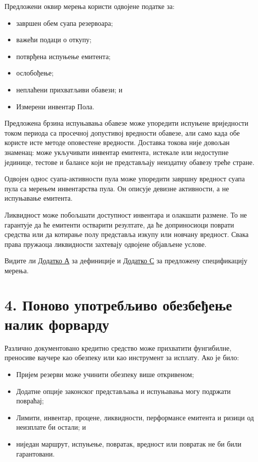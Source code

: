 \documentclass[11pt]{article}
\begin{document}
Предложени оквир мерења користи одвојене податке за:

\begin{itemize}[leftmargin=*]
\item завршен обем суапа резервоара;
\item важећи подаци о откупу;
\item потврђена испуњење емитента;
\item ослобођење;
\item неплаћени прихватљиви обавези; и
\item Измерени инвентар Пола.
\end{itemize}
Предложена брзина испуњавања обавезе може упоредити испуњене вриједности током периода са просечној допустивој вредности обавезе, али само када обе користе исте методе оповестене вредности. Доставка токова није довољан знаменац: може укључивати инвентар емитента, истекале или недоступне јединице, тестове и балансе који не представљају неиздатну обавезу треће стране.

Одвојен однос суапа-активности пула може упоредити завршну вредност суапа пула са мерењем инвентарства пула. Он описује девизне активности, а не испуњавање емитента.

Ликвидност може побољшати доступност инвентара и олакшати размене. То не гарантује да ће емитенти остварити резултате, да ће доприносиоци поврати средства или да котирање полу представља изкупу или новчану вредност. Свака права пружаоца ликвидности захтевају одвојене објављене услове.

Видите ли \href{https://docs.cosmolocal.credit/sr/white-paper/appendix-a-math-box}{Додатко А} за дефиниције и \href{https://docs.cosmolocal.credit/sr/white-paper/appendix-c-kpi-definitions}{Додатко С} за предложену спецификацију мерења.


\section*{4. Поново употребљиво обезбеђење налик форварду}

Различно документовано кредитно средство може прихватити фунгибилне, преносиве ваучере као обезпеку или као инструмент за исплату. Ако је било:

\begin{itemize}[leftmargin=*]
\item Пријем резерви може учинити обезпеку више откривеном;
\item Додатне опције законског представљања и испуњавања могу подржати повраћај;
\item Лимити, инвентар, процене, ликвидности, перформансе емитента и ризици од неизплате би остали; и
\item ниједан маршрут, испуњење, повратак, вредност или повратак не би били гарантовани.
\end{itemize}
\end{document}
